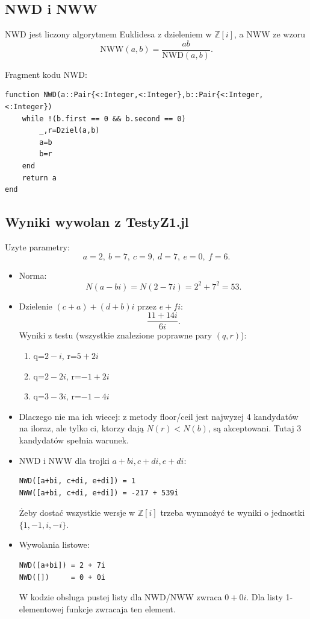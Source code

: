 \documentclass[12pt,a4paper]{article}
\begin{document}
\subsection*{NWD i NWW}
NWD jest liczony algorytmem Euklidesa z dzieleniem w $\mathbb{Z}[i]$,
a NWW ze wzoru
\[
\mathrm{NWW}(a,b)=\frac{ab}{\mathrm{NWD}(a,b)}.
\]

Fragment kodu NWD:
\begin{verbatim}
function NWD(a::Pair{<:Integer,<:Integer},b::Pair{<:Integer,<:Integer})
	while !(b.first == 0 && b.second == 0)
		_,r=Dziel(a,b)
		a=b
		b=r
	end
	return a
end
\end{verbatim}

\subsection*{Wyniki wywolan z TestyZ1.jl}
Uzyte parametry:
\[
a=2,\ b=7,\ c=9,\ d=7,\ e=0,\ f=6.
\]

\begin{itemize}
\item Norma:
\[
N(a-bi)=N(2-7i)=2^2+7^2=53.
\]

\item Dzielenie $(c+a)+(d+b)i$ przez $e+fi$:
\[
\frac{11+14i}{6i}.
\]
Wyniki z testu (wszystkie znalezione poprawne pary $(q,r)$):
\begin{enumerate}
    \item q=$2-i$, r=$5+2i$
    \item q=$2-2i$, r=$-1+2i$
    \item q=$3-3i$, r=$-1-4i$
\end{enumerate}

\item Dlaczego nie ma ich wiecej:
z metody floor/ceil jest najwyzej 4 kandydatów na iloraz,
ale tylko ci, ktorzy dają $N(r)<N(b)$, są akceptowani.
Tutaj 3 kandydatów spełnia warunek.

\item NWD i NWW dla trojki $a+bi, c+di, e+di$:
\begin{verbatim}
NWD([a+bi, c+di, e+di]) = 1
NWW([a+bi, c+di, e+di]) = -217 + 539i
\end{verbatim}
Żeby dostać wszystkie wersje w $\mathbb{Z}[i]$ trzeba wymnożyć te wyniki o jednostki $\{1,-1,i,-i\}$.

\item Wywolania listowe:
\begin{verbatim}
NWD([a+bi]) = 2 + 7i
NWD([])     = 0 + 0i
\end{verbatim}
W kodzie obsluga pustej listy dla NWD/NWW zwraca $0+0i$.
Dla listy 1-elementowej funkcje zwracaja ten element.
\end{itemize}
\end{document}
